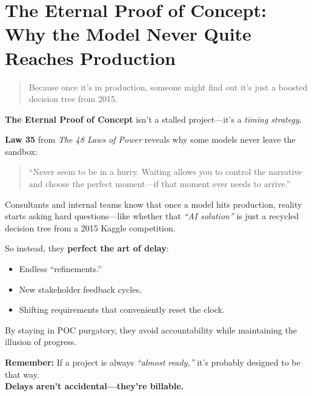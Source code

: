 \section{The Eternal Proof of Concept: Why the Model Never Quite Reaches Production}

\begin{quote}
Because once it’s in production, someone might find out it’s just a boosted decision tree from 2015.
\end{quote}

  \textbf{The Eternal Proof of Concept} isn’t a stalled project—it’s a \textit{timing strategy}.
  
  \medskip
  
  \textbf{Law 35} from \textit{The 48 Laws of Power} reveals why some models never leave the sandbox:
  \begin{quote}
  ``Never seem to be in a hurry. Waiting allows you to control the narrative and choose the perfect moment—if that moment ever needs to arrive.''
  \end{quote}
  
  \medskip
  
  Consultants and internal teams know that once a model hits production, reality starts asking hard questions—like whether that \textit{``AI solution''} is just a recycled decision tree from a 2015 Kaggle competition.
  
  \medskip
  
  So instead, they \textbf{perfect the art of delay}:
  \begin{itemize}
    \item Endless ``refinements.''
    \item New stakeholder feedback cycles.
    \item Shifting requirements that conveniently reset the clock.
  \end{itemize}
  
  \medskip
  
  By staying in POC purgatory, they avoid accountability while maintaining the illusion of progress.
  
  \medskip
  
  \textbf{Remember:} If a project is always \textit{``almost ready,''} it’s probably designed to be that way. \\
  \textbf{Delays aren’t accidental—they’re billable.}
  


